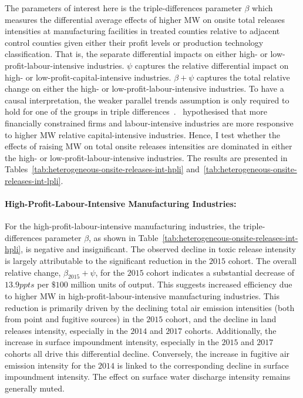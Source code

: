 \documentclass[12pt, english]{article}
\begin{document}
    The parameters of interest here is the triple-differences parameter $\beta$ which measures the differential average effects of higher MW on onsite total releases intensities at manufacturing facilities in treated counties relative to adjacent control counties given either their profit levels or production technology classification. That is, the separate differential impacts on either high- or low-profit-labour-intensive industries. $\psi$ captures the relative differential impact on high- or low-profit-capital-intensive industries. $\beta + \psi$ captures the total relative change on either the high- or low-profit-labour-intensive industries. To have a causal interpretation, the weaker parallel trends assumption is only required to hold for one of the groups in triple differences~\parencite{olden2022triple}.~\cite{zhang2023unintended} hypothesised that more financially constrained firms and labour-intensive industries are more responsive to higher MW relative capital-intensive industries. Hence, I test whether the effects of raising MW on total onsite releases intensities are dominated in either the high- or low-profit-labour-intensive industries. The results are presented in Tables~\ref{tab:heterogeneous-onsite-releases-int-hpli} and~\ref{tab:heterogeneous-onsite-releases-int-lpli}.

    \paragraph{High-Profit-Labour-Intensive Manufacturing Industries:}
    For the high-profit-labour-intensive manufacturing industries, the triple-differences parameter $\beta$, as shown in Table~\ref{tab:heterogeneous-onsite-releases-int-hpli}, is negative and insignificant. The observed decline in toxic release intensity is largely attributable to the significant reduction in the $2015$ cohort. The overall relative change, $\beta_{2015} + \psi$, for the $2015$ cohort indicates a substantial decrease of $13.9ppts$ per $\$100$ million units of output. This suggests increased efficiency due to higher MW in high-profit-labour-intensive manufacturing industries. This reduction is primarily driven by the declining total air emission intensities (both from point and fugitive sources) in the $2015$ cohort, and the decline in land releases intensity, especially in the $2014$ and $2017$ cohorts. Additionally, the increase in surface impoundment intensity, especially in the $2015$ and $2017$ cohorts all drive this differential decline. Conversely, the increase in fugitive air emission intensity for the $2014$ is linked to the corresponding decline in surface impoundment intensity. The effect on surface water discharge intensity remains generally muted.
    
\end{document}
